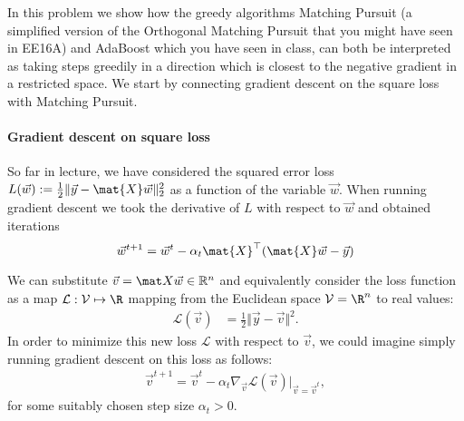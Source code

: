 \documentclass[preview]{standalone}
\begin{document}
\newcommand{\vf}{v_f}
\newcommand{\vF}{v_F}
\newcommand{\Loss}{\mathcal{L}}
\newcommand{\loss}{\ell}
\newcommand{\Indi}[1]{\mathbb{I}(#1)}
\newcommand{\effFspace}{\mathcal{F}(\xn)}
\newcommand{\effF}{\Func(\xn)}
\newcommand{\hatfada}[1]{\func^{#1}_{Ada}}
\newcommand{\hatfgrad}[1]{\func^{#1}}
\newcommand{\effhatfada}[1]{\vec{\hatfada{#1}}}
\newcommand{\effhatfgrad}[1]{\vec{\hatfgrad{#1}}}
\renewcommand{\F}{\mathcal{F}}
\newcommand{\err}[1]{\epsilon_{#1}}
\newcommand{\E}{\text{e}}
\newcommand{\weight}[2]{w_{#1}^{#2}}
\newcommand{\Xcol}[1]{\vec{\phi}_{#1}(\mat{X})}
\newcommand{\weakspace}{\mathcal{W}}
\newcommand{\effweakspace}{\weakspace(\xn)}
\newcommand{\res}[1]{\vec{r}^{#1}}
\newcommand{\ind}[1]{i_{#1}}
\newcommand{\Fspace}{\mathcal{F}}
\newcommand{\Lossw}{\mathcal{L}_{\vec{w}}}
\newcommand{\Vspace}{\mathcal{V}}
\newcommand{\hatF}{\Func_{\text{final}}}
\renewcommand{\Y}{\mathcal{Y}}
\newcommand{\fvec}{\vec{{\func}}}
\newcommand{\Fvec}{\vec{\Func}}
\newcommand{\xn}{\{\vec{x}\}_{i=1}^n}
\newcommand{\tilvecv}{\widetilde{\vec{v}}}
\newcommand{\tilVspace}{\widetilde{\Vspace}}
\newcommand{\Func}{f}
\newcommand{\func}{\widetilde{f}}


In this problem we show how the greedy algorithms Matching Pursuit (a
simplified version of the Orthogonal Matching Pursuit that you might
have seen in EE16A) and AdaBoost which you have seen in class, can both be
interpreted as taking steps greedily in a direction which is closest to the negative gradient in a restricted space.
We start by connecting gradient descent on the square loss with Matching Pursuit.

\paragraph{Gradient descent on square loss}
So far in lecture, we have considered the squared error loss
$L(\vec{w}) := \frac{1}{2}\|\vec{y} -\mat{X}\vec{w}\|_2^2$ as a
function of the variable $\vec w$. When running gradient descent we
took the derivative of $L$ with respect to $\vec{w}$ and obtained iterations
\begin{equation}
  \label{eq:gradupdate}
    \vec{w}^{t+1} = \vec{w}^t - \alpha_t \mat{X}^\top (\mat{X}\vec{w} - \vec{y})
\end{equation}

We can substitute $\vec v = \mat X \vec w \in \mathbb{R}^n$ and
equivalently consider the loss function as a map $\Loss : \Vspace \mapsto \R$ mapping
from the Euclidean space
$\Vspace = \R^n$ to real values:
\begin{align*}
  \Loss(\vec{v}) &= \frac{1}{2} \Vert \vec y - \vec v \Vert^2.
\end{align*}
In order to minimize this new loss $\Loss$ with respect to $\vec v$, 
we could imagine simply running gradient descent on this loss as follows:
\begin{align}
\label{eq:gd_on_v}
  \vec v^{t+1} = \vec v^t - \alpha_t \nabla_{\vec v} \Loss(\vec v) |_{\vec v = \vec v^t},
\end{align}
for some suitably chosen step size $\alpha_t > 0$.
\end{document}
